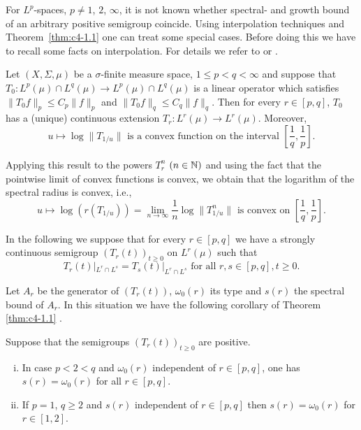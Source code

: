 For $L^{p}$-spaces, $p \neq 1$, $2$, $\infty$, it is not known whether spectral- and growth bound of an arbitrary positive semigroup coincide.
Using interpolation techniques and  Theorem~\ref{thm:c4-1.1}  one can treat some special cases.
Before doing this we have to recall some facts on interpolation.
For details we refer to 
\citet[VI.10]{dunfordschwartz:1958} or \citet[IX.4.]{reedsimon:1975}.

Let $(X,\Sigma,\mu)$ be a $\sigma$-finite measure space, $1 \leq p < q < \infty$ and suppose that $T_{0} \colon L^{p}(\mu) \cap L^{q}(\mu) \to L^{p}(\mu) \cap L^{q}(\mu)$ is a linear operator which satisfies $\|T_{0}f\|_{p} \leq C_{p}\|f\|_{p}$ and $\|T_{0}f\|_{q} \leq C_{q}\|f\|_{q}$.
Then for every $r \in [p,q]$, $T_{0}$ has a (unique) continuous extension $T_{r} \colon L^{r}(\mu) \to L^{r}(\mu)$.
Moreover,
\begin{equation}\label{eq:c4-1.1}
u \mapsto \log\|T_{1/u}\| \text{ is a convex function on the interval } \left[\frac{1}{q},\frac{1}{p}\right].
\end{equation}

Applying this result to the powers $T_{r}^{n}$ $(n \in\mathbb{N})$ and using the fact that the pointwise limit of convex functions is convex, we obtain that the logarithm of the spectral radius is convex, i.e.,
\begin{equation}\label{eq:c4-1.2}
u \mapsto \log(r(T_{1/u})) = \lim_{n\to\infty} \frac{1}{n}\log\|T_{1/u}^{n}\| \text{ is convex on } \left[\frac{1}{q},\frac{1}{p}\right].
\end{equation}

In the following we suppose that for every $r \in [p,q]$ we have a strongly continuous semigroup $(T_{r}(t))_{t\geq 0}$ on $L^{r}(\mu)$ such that
\begin{equation}\label{eq:c4-1.3}
T_{r}(t)|_{L^{r} \cap L^{s}} = T_{s}(t)|_{L^{r} \cap L^{s}} \text{ for all } r,s \in [p,q], t \geq 0.
\end{equation}

Let $A_{r}$ be the generator of $(T_{r}(t))$, $\omega_{0}(r)$ its type and $s(r)$ the spectral bound of $A_{r}$.
In this situation we have the following corollary of Theorem \ref{thm:c4-1.1} .

\begin{corollary}\label{cor:c4-1.2}
Suppose that the semigroups $(T_{r}(t))_{t\geq 0}$ are positive.
\begin{enumerate}[(i)]
\item \label{cor:c4-1.2-1}
In case $p < 2 < q$ and $\omega_{0}(r)$ independent of $r \in [p,q]$, one has $s(r) = \omega_{0}(r)$ for all $r \in [p,q]$.
\item \label{cor:c4-1.2-2}
If $p = 1$, $q \geq 2$ and $s(r)$ independent of $r \in [p,q]$ then $s(r) = \omega_{0}(r)$ for $r \in [1,2]$.
\end{enumerate}
\end{corollary}

